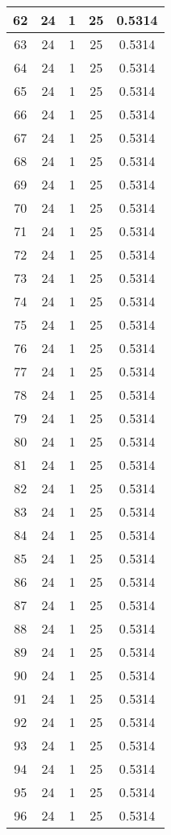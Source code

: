 \documentclass[letterpaper, 12pt]{article}
\begin{document}
\begin{longtable}{|c|c|c|c|c|}
\hline
62 & 24 & 1 & 25 & 0.5314 \\
\hline
63 & 24 & 1 & 25 & 0.5314 \\
\hline
64 & 24 & 1 & 25 & 0.5314 \\
\hline
65 & 24 & 1 & 25 & 0.5314 \\
\hline
66 & 24 & 1 & 25 & 0.5314 \\
\hline
67 & 24 & 1 & 25 & 0.5314 \\
\hline
68 & 24 & 1 & 25 & 0.5314 \\
\hline
69 & 24 & 1 & 25 & 0.5314 \\
\hline
70 & 24 & 1 & 25 & 0.5314 \\
\hline
71 & 24 & 1 & 25 & 0.5314 \\
\hline
72 & 24 & 1 & 25 & 0.5314 \\
\hline
73 & 24 & 1 & 25 & 0.5314 \\
\hline
74 & 24 & 1 & 25 & 0.5314 \\
\hline
75 & 24 & 1 & 25 & 0.5314 \\
\hline
76 & 24 & 1 & 25 & 0.5314 \\
\hline
77 & 24 & 1 & 25 & 0.5314 \\
\hline
78 & 24 & 1 & 25 & 0.5314 \\
\hline
79 & 24 & 1 & 25 & 0.5314 \\
\hline
80 & 24 & 1 & 25 & 0.5314 \\
\hline
81 & 24 & 1 & 25 & 0.5314 \\
\hline
82 & 24 & 1 & 25 & 0.5314 \\
\hline
83 & 24 & 1 & 25 & 0.5314 \\
\hline
84 & 24 & 1 & 25 & 0.5314 \\
\hline
85 & 24 & 1 & 25 & 0.5314 \\
\hline
86 & 24 & 1 & 25 & 0.5314 \\
\hline
87 & 24 & 1 & 25 & 0.5314 \\
\hline
88 & 24 & 1 & 25 & 0.5314 \\
\hline
89 & 24 & 1 & 25 & 0.5314 \\
\hline
90 & 24 & 1 & 25 & 0.5314 \\
\hline
91 & 24 & 1 & 25 & 0.5314 \\
\hline
92 & 24 & 1 & 25 & 0.5314 \\
\hline
93 & 24 & 1 & 25 & 0.5314 \\
\hline
94 & 24 & 1 & 25 & 0.5314 \\
\hline
95 & 24 & 1 & 25 & 0.5314 \\
\hline
96 & 24 & 1 & 25 & 0.5314 \\

\end{longtable}
\end{document}
